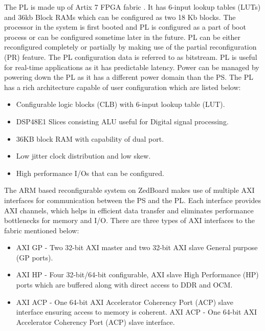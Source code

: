 The PL is made up of Artix 7 FPGA fabric \cite{12}. It has 6-input lookup tables (LUTs) and 36kb Block RAMs which can be configured as two 18 Kb blocks. The processor in the system is first booted and PL is configured as a part of boot process or can be configured sometime later in the future. PL can be either reconfigured completely or partially by making use of the partial reconfiguration (PR) feature. The PL configuration data is referred to as bitstream. PL is useful for real-time applications as it has predictable latency. Power can be managed by powering down the PL as it has a different power domain than the PS. The PL has a rich architecture capable of user configuration which are listed below:

\begin{itemize}
\item Configurable logic blocks (CLB) with 6-input lookup table (LUT).
\item DSP48E1 Slices consisting ALU useful for Digital signal processing.
\item 36KB block RAM with capability of dual port.
\item Low jitter clock distribution and low skew.
\item High performance I/Os that can be configured.
\end{itemize}

The ARM based reconfigurable system on ZedBoard makes use of multiple AXI interfaces for communication between the PS and the PL. Each interface provides AXI channels, which helps in efficient data transfer and eliminates performance bottlenecks for memory and I/O. There are three types of AXI interfaces to the fabric mentioned below:

\begin{itemize}
\item AXI GP - Two 32-bit AXI master and two 32-bit AXI slave General purpose (GP ports).
\item AXI HP - Four 32-bit/64-bit configurable, AXI slave High Performance (HP) ports which are buffered along with direct access to DDR and OCM.
\item AXI ACP - One 64-bit AXI Accelerator Coherency Port (ACP) slave interface ensuring access to memory is coherent. AXI ACP - One 64-bit AXI Accelerator Coherency Port (ACP) slave interface.
\end{itemize}

